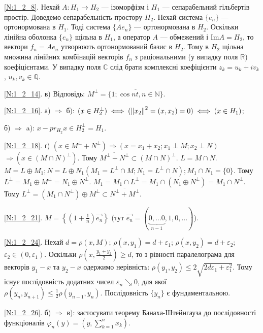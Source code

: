 \noindent\ref{N:1_2_8}. Нехай $A: H_1 \to H_2$ --- ізоморфізм і $H_1$ --- сепарабельний
гільбертів простір. Доведемо сепарабельність простору $H_2$. Нехай система $\{e_n\}$ ---
ортонормована в $H_1$. Тоді система $\{A e_n\}$ --- ортонормована в $H_2$. Оскільки
лінійна оболонка $\{e_n\}$ щільна в $H_1$, а оператор $A$ --- обмежений і $\mathrm{Im}A = H_2$,
то вектори $f_n = A e_n$ утворюють ортонормований базис в $H_2$. Тому в $H_2$ щільна
множина лінійних комбінацій векторів $f_n$ з раціональними (у випадку поля $\mathbb{R}$)
коефіцієнтами. У випадку поля $\mathbb{C}$ слід брати комплексні коефіцієнти
$z_k = u_k + i v_k$, $u_k, v_k \in \mathbb{Q}$.

\noindent\ref{N:1_2_14}. в) Відповідь: $M^{\perp} = \overline{\{1; \cos nt, n \in \mathbb{N} \}}$.

\noindent\ref{N:1_2_16}. а) $\Rightarrow$ б): 
$(x \in H_2^{\perp}) \iff (\left\lVert x_2\right\rVert^2 = (x, x_2) = 0) \iff (x \in H_1)$;

\noindent б) $\Rightarrow$ a): $x - pr_{H_2} x \in H_2^{\perp} = H_1$.

\noindent\ref{N:1_2_18}. ґ) $(x \in M^{\perp}+N^{\perp}) \Rightarrow (x = x_1+x_2; x_1 \perp M; x_2 \perp N)$
$\Rightarrow (x \in (M \cap N)^{\perp})$. Тому $\overline{M^{\perp} + N^{\perp}} \subset (M \cap N)^{\perp}$.
$L = M \cap N$. $M = L \oplus  M_1; N = L \oplus N_1 (M_1 = L^{\perp} \cap M; N_1 = L^{\perp} \cap N); M_1 \cap N_1 = \{0\}$.
Тому $L^{\perp} = M_1 \oplus M^{\perp} = N_1 \oplus N^{\perp}$. 
$M_1 = M_1 \cap L^{\perp} = M_1 \cap (N_1 \oplus N^{\perp}) = M_1 \cap N^{\perp}$. 
Тому $L^{\perp} = (M_1 \cap N^{\perp}) \oplus M^{\perp} \subset \overline{N^{\perp} + M^{\perp}}$.

\noindent\ref{N:1_2_21}. $M = \left\{(1+\frac{1}{n})\vec{e_n}\right\}$ 
(тут $\vec{e_n} = (\underbrace{0, \dots 0}_{n-1}, 1, 0, \dots)$).

\noindent\ref{N:1_2_24}. Нехай $d = \rho(x, M)$; $\rho(x, y_1) = d + \varepsilon_1$; $\rho(x, y_2) = d + \varepsilon_2$;
$\varepsilon_2 \in (0, \varepsilon_1)$. Оскільки $\rho(x, \frac{y_1+y_2}{2}) \geq d$, то з
рівності паралелограма для векторів $y_1 - x$ та $y_2 - x$ одержимо нерівність: 
$\rho(y_1, y_2) \leq 2 \sqrt{2d\varepsilon_1 + \varepsilon_1^2}$. Тому існує послідовність додатних чисел
$\varepsilon_n \searrow 0$, для якої $\rho(y_n, y_{n+1}) \leq \frac{1}{2} \rho(y_{n-1}, y_n)$.
Послідовність $\{y_n\}$ є фундаментальною.

\noindent\ref{N:1_2_26}. б) $\Rightarrow$ в): застосувати теорему Банаха-Штейнгауза до послідовності функціоналів
$\varphi_n (y) = \left(y, \sum\limits_{k = 1}^n x_k\right)$.

